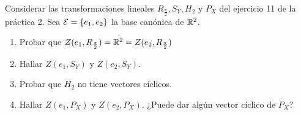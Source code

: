 \item Considerar las transformaciones lineales $R_\frac{\pi}{2},S_Y,H_2$ y $P_X$ del ejercicio 11 de la práctica 2. Sea $\mathcal{E}=\{e_1,e_2\}$ la base canónica de $\mathbb{R}^2$.
    \begin{enumerate}
        \item Probar que $Z(e_1,R_\frac{\pi}{2})=\mathbb{R}^2=Z(e_2,R_\frac{\pi}{2})$
            \begin{mdframed}[style=s]
                
            \end{mdframed}
        \item Hallar $Z(e_1,S_Y)$ y $Z(e_2,S_Y)$.
            \begin{mdframed}[style=s]
                
            \end{mdframed}
        \item Probar que $H_2$ no tiene vectores cíclicos.
            \begin{mdframed}[style=s]
                
            \end{mdframed}
        \item Hallar $Z(e_1,P_X)$ y $Z(e_2,P_X)$. ¿Puede dar algún vector cíclico de $P_X$?
            \begin{mdframed}[style=s]
                
            \end{mdframed}
    \end{enumerate}
